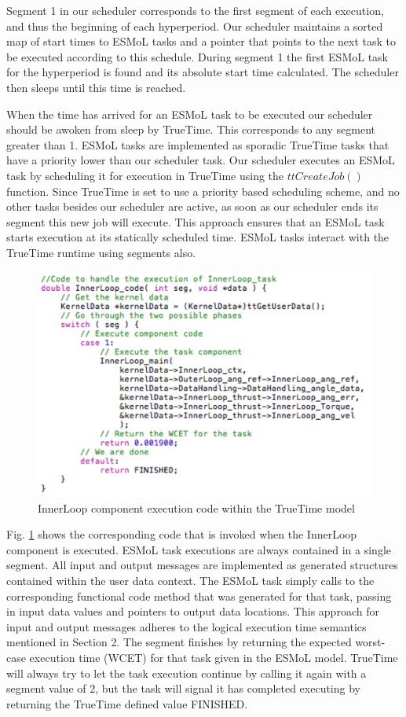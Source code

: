 Segment 1 in our scheduler corresponds to the first segment of each execution, and thus the beginning of each hyperperiod.  Our scheduler maintains a sorted map of start times to ESMoL tasks and a pointer that points to the next task to be executed according to this schedule.  During segment 1 the first ESMoL task for the hyperperiod is found and its absolute start time calculated.  The scheduler then sleeps until this time is reached.

When the time has arrived for an ESMoL task to be executed our scheduler should be awoken from sleep by TrueTime.  This corresponds to any segment greater than 1.  ESMoL tasks are implemented as sporadic TrueTime tasks that have a priority lower than our scheduler task.  Our scheduler executes an ESMoL task by scheduling it for execution in TrueTime using the $ttCreateJob()$ function.  Since TrueTime is set to use a priority based scheduling scheme, and no other tasks besides our scheduler are active, as soon as our scheduler ends its segment this new job will execute.  This approach ensures that an ESMoL task starts execution at its statically scheduled time.  ESMoL tasks interact with the TrueTime runtime using segments also.
\begin{figure}[htb]
\centering
\includegraphics[width=\columnwidth]{figures/task_exec.pdf}
    \caption{InnerLoop component execution code within the TrueTime model}
    \label{fig:task_exec}
\end{figure}
Fig. \ref{fig:task_exec} shows the corresponding code that is invoked when the InnerLoop component is executed.  ESMoL task executions are always contained in a single segment.  All input and output messages are implemented as generated structures contained within the user data context.  The ESMoL task simply calls to the corresponding functional code method that was generated for that task, passing in input data values and pointers to output data locations.  This approach for input and output messages adheres to the logical execution time semantics mentioned in Section 2.  The segment finishes by returning the expected worst-case execution time (WCET) for that task given in the ESMoL model.  TrueTime will always try to let the task execution continue by calling it again with a segment value of 2, but the task will signal it has completed executing by returning the TrueTime defined value FINISHED.

